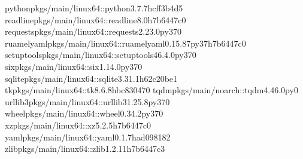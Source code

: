 \documentclass[a4paper,11pt,english]{sphinxmanual}
\begin{document}
\begin{sphinxVerbatim}[commandchars=\\\{\}]
pythonpkgs/main/linux\PYGZhy{}64::python\PYGZhy{}3.7.7\PYGZhy{}hcff3b4d\PYGZus{}5
readlinepkgs/main/linux\PYGZhy{}64::readline\PYGZhy{}8.0\PYGZhy{}h7b6447c\PYGZus{}0
requestspkgs/main/linux\PYGZhy{}64::requests\PYGZhy{}2.23.0\PYGZhy{}py37\PYGZus{}0
ruamel\PYGZus{}yamlpkgs/main/linux\PYGZhy{}64::ruamel\PYGZus{}yaml\PYGZhy{}0.15.87\PYGZhy{}py37h7b6447c\PYGZus{}0
setuptoolspkgs/main/linux\PYGZhy{}64::setuptools\PYGZhy{}46.4.0\PYGZhy{}py37\PYGZus{}0
sixpkgs/main/linux\PYGZhy{}64::six\PYGZhy{}1.14.0\PYGZhy{}py37\PYGZus{}0
sqlitepkgs/main/linux\PYGZhy{}64::sqlite\PYGZhy{}3.31.1\PYGZhy{}h62c20be\PYGZus{}1
tkpkgs/main/linux\PYGZhy{}64::tk\PYGZhy{}8.6.8\PYGZhy{}hbc83047\PYGZus{}0
tqdmpkgs/main/noarch::tqdm\PYGZhy{}4.46.0\PYGZhy{}py\PYGZus{}0
urllib3pkgs/main/linux\PYGZhy{}64::urllib3\PYGZhy{}1.25.8\PYGZhy{}py37\PYGZus{}0
wheelpkgs/main/linux\PYGZhy{}64::wheel\PYGZhy{}0.34.2\PYGZhy{}py37\PYGZus{}0
xzpkgs/main/linux\PYGZhy{}64::xz\PYGZhy{}5.2.5\PYGZhy{}h7b6447c\PYGZus{}0
yamlpkgs/main/linux\PYGZhy{}64::yaml\PYGZhy{}0.1.7\PYGZhy{}had09818\PYGZus{}2
zlibpkgs/main/linux\PYGZhy{}64::zlib\PYGZhy{}1.2.11\PYGZhy{}h7b6447c\PYGZus{}3



\end{sphinxVerbatim}
\end{document}
